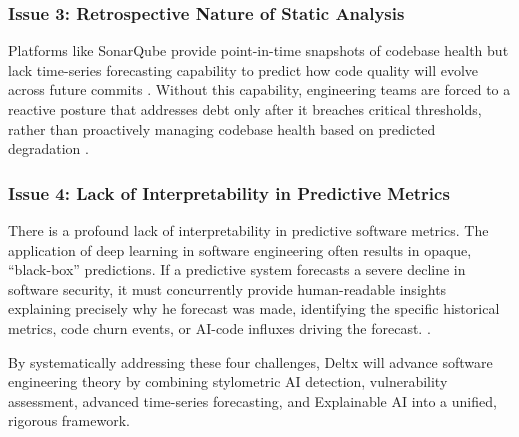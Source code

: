 \subsubsection*{Issue 3: Retrospective Nature of Static Analysis}

Platforms like SonarQube provide point-in-time snapshots of codebase health but lack time-series forecasting capability to predict how code quality will evolve across future commits \parencite{sonarcommunity_historical_data}. Without this capability, engineering teams are forced to a reactive posture that addresses debt only after it breaches critical thresholds, rather than proactively managing codebase health based on predicted degradation \parencite{software_service_supporting_software_quality_forecasting}.

\subsubsection*{Issue 4: Lack of Interpretability in Predictive Metrics}

There is a profound lack of interpretability in predictive software metrics. The application of deep learning in software engineering often results in opaque, ``black-box'' predictions. If a predictive system forecasts a severe decline in software security, it must concurrently provide human-readable insights explaining precisely why he forecast was made, identifying the specific historical metrics, code churn events, or AI-code influxes driving the forecast. \parencite{perspective_on_xai_methods_shap_and_lime}.

\vspace{0.5cm}

By systematically addressing these four challenges, Deltx will advance software engineering theory by combining stylometric AI detection, vulnerability assessment, advanced time-series forecasting, and Explainable AI into a unified, rigorous framework.